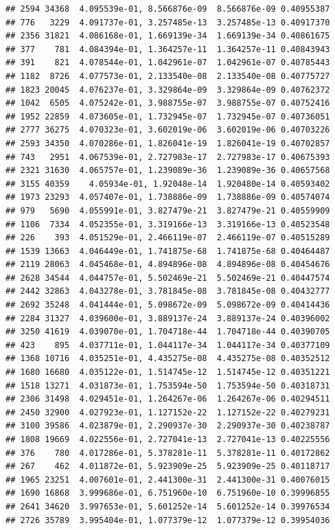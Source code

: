 \documentclass[
]{article}
\begin{document}
\begin{verbatim}
## 2594 34368  4.095539e-01, 8.566876e-09  8.566876e-09 0.40955387
## 776   3229  4.091737e-01, 3.257485e-13  3.257485e-13 0.40917370
## 2356 31821  4.086168e-01, 1.669139e-34  1.669139e-34 0.40861675
## 377    781  4.084394e-01, 1.364257e-11  1.364257e-11 0.40843943
## 391    821  4.078544e-01, 1.042961e-07  1.042961e-07 0.40785443
## 1182  8726  4.077573e-01, 2.133540e-08  2.133540e-08 0.40775727
## 1823 20045  4.076237e-01, 3.329864e-09  3.329864e-09 0.40762372
## 1042  6505  4.075242e-01, 3.988755e-07  3.988755e-07 0.40752416
## 1952 22859  4.073605e-01, 1.732945e-07  1.732945e-07 0.40736051
## 2777 36275  4.070323e-01, 3.602019e-06  3.602019e-06 0.40703226
## 2593 34350  4.070286e-01, 1.826041e-19  1.826041e-19 0.40702857
## 743   2951  4.067539e-01, 2.727983e-17  2.727983e-17 0.40675393
## 2321 31630  4.065757e-01, 1.239089e-36  1.239089e-36 0.40657568
## 3155 40359    4.05934e-01, 1.92048e-14  1.920480e-14 0.40593402
## 1973 23293  4.057407e-01, 1.738886e-09  1.738886e-09 0.40574074
## 979   5690  4.055991e-01, 3.827479e-21  3.827479e-21 0.40559909
## 1106  7334  4.052355e-01, 3.319166e-13  3.319166e-13 0.40523548
## 226    393  4.051529e-01, 2.466119e-07  2.466119e-07 0.40515289
## 1539 13663  4.046449e-01, 1.741875e-68  1.741875e-68 0.40464487
## 2119 28063  4.045468e-01, 4.894896e-08  4.894896e-08 0.40454676
## 2628 34544  4.044757e-01, 5.502469e-21  5.502469e-21 0.40447574
## 2442 32863  4.043278e-01, 3.781845e-08  3.781845e-08 0.40432777
## 2692 35248  4.041444e-01, 5.098672e-09  5.098672e-09 0.40414436
## 2284 31327  4.039600e-01, 3.889137e-24  3.889137e-24 0.40396002
## 3250 41619  4.039070e-01, 1.704718e-44  1.704718e-44 0.40390705
## 423    895  4.037711e-01, 1.044117e-34  1.044117e-34 0.40377109
## 1368 10716  4.035251e-01, 4.435275e-08  4.435275e-08 0.40352512
## 1680 16680  4.035122e-01, 1.514745e-12  1.514745e-12 0.40351221
## 1518 13271  4.031873e-01, 1.753594e-50  1.753594e-50 0.40318731
## 2306 31498  4.029451e-01, 1.264267e-06  1.264267e-06 0.40294511
## 2450 32900  4.027923e-01, 1.127152e-22  1.127152e-22 0.40279231
## 3100 39586  4.023879e-01, 2.290937e-30  2.290937e-30 0.40238787
## 1808 19669  4.022556e-01, 2.727041e-13  2.727041e-13 0.40225556
## 376    780  4.017286e-01, 5.378281e-11  5.378281e-11 0.40172862
## 267    462  4.011872e-01, 5.923909e-25  5.923909e-25 0.40118717
## 1965 23251  4.007601e-01, 2.441300e-31  2.441300e-31 0.40076015
## 1690 16868  3.999686e-01, 6.751960e-10  6.751960e-10 0.39996855
## 2641 34620  3.997653e-01, 5.601252e-14  5.601252e-14 0.39976534
## 2726 35789  3.995404e-01, 1.077379e-12  1.077379e-12 0.39954036

\end{verbatim}
\end{document}
